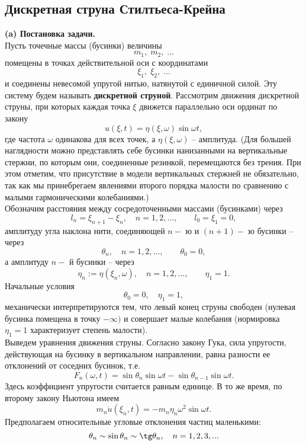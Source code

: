 \documentclass[12pt,a4paper]{article}
\theoremstyle{plain}   \newtheorem{Pro}{Задача}
\begin{document}
\subsection{Дискретная струна Стилтьеса-Крейна}
{\bfseries (a) Постановка задачи.} \\

Пусть точечные массы (бусинки) величины
$$
  m_1 , \; m_2 , \; ...
$$
помещены в точках действительной оси с координатами
$$
  \xi _1 , \; \xi _2 , \; ...
$$
и соединены невесомой упругой нитью, натянутой с единичной силой.
Эту систему будем называть
{\bfseries дискретной струной}.
Рассмотрим движения дискретной струны, при которых каждая точка
$ \xi $
движется параллельно оси ординат по закону
$$
  u(\xi ,t)=\eta (\xi , \omega )\sin \omega t ,
$$
где частота
$ \omega $
одинакова для всех точек, а
$ \eta (\xi ,\omega ) $
-- амплитуда.
(Для большей наглядности можно представлять себе бусинки
нанизанными на вертикальные стержни, по которым они,
соединенные резинкой, перемещаются без трения.
При этом отметим, что присутствие в модели вертикальных
стержней не обязательно, так как мы принебрегаем явлениями
второго порядка малости по сравнению с малыми
гармоническими колебаниями.)\\
Обозначим расстояния между сосредоточенными массами (бусинками)
через
$$
  l_n =\xi _{n+1}-\xi _n ,
    \quad n=1,2,..., \qquad
	  l_0 =\xi _1 =0,
$$
амплитуду угла наклона нити, соединяющей
$ n- $
ю и
$ (n+1)- $
ю бусинки -- через
$$
  \theta _n , \quad n=1,2,..., \qquad \theta _0 =0,
$$
а амплитуду
$ n- $
й бусинки -- через
$$
  \eta _n :=\eta (\xi _n ,\omega ),
    \quad n=1,2,..., \qquad \eta _1 =1.
$$
Начальные условия
$$
  \theta _0 =0, \quad \eta _1 =1,
$$
механически интерпретируются тем, что левый конец струны
свободен (нулевая бусинка помещена в точку
$ -\infty ) $
и совершает малые колебания (нормировка
$ \eta _1 =1 $
характеризует степень малости). \\
Выведем уравнения движения струны.
Согласно закону Гука, сила упругости, действующая
на бусинку в вертикальном направлении, равна
разности ее отклонений от соседних бусинок, т.е.
$$
  F_n (\omega ,t)=\sin \theta _n \sin \omega t-
    \sin \theta _{n-1}\sin \omega t.
$$
Здесь коэффициент упругости считается равным единице.
В то же время, по второму закону Ньютона имеем
$$
  m_n \ddot u(\xi _n ,t)=-m_n \eta _n \omega ^2 \sin \omega t.
$$
Предполагаем относительные угловые отклонения частиц
маленькими:
$$
  \theta _n \sim \sin \theta _n \sim \tg \theta _n ,
    \quad n=1,2,3,...
$$
\end{document}
